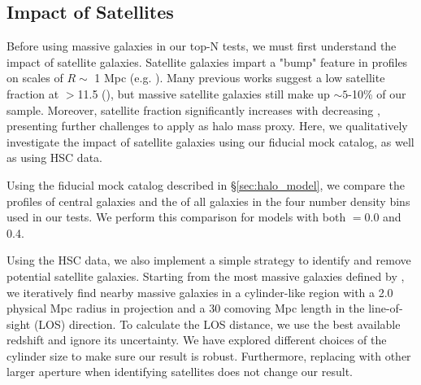 \documentclass[fleqn,usenatbib,useAMS,english]{mnras}
\begin{document}
\subsection{Impact of Satellites}
    \label{sec:satellite}


    Before using massive galaxies in our top-N tests, we must first understand the impact of
    satellite galaxies. Satellite galaxies impart a "bump" feature in \dsigma{} profiles on
    scales of $R\sim$ 1 Mpc (e.g. \citealt{Mandelbaum2006a, Leauthaud2012}).
    Many previous works suggest a low satellite fraction at \logms{}$>$11.5 (\addref{}), but
    massive satellite galaxies still make up $\sim 5$-10\% of our sample.
    Moreover, satellite fraction significantly increases with decreasing \mstar{}, presenting
    further challenges to apply \mstar{} as halo mass proxy.
    Here, we qualitatively investigate the impact of satellite galaxies using our fiducial mock
    catalog, as well as using HSC data.

    Using the fiducial mock catalog described in \S \ref{sec:halo_model}, we compare the
    \dsigma{} profiles of central galaxies and the \dsigma{} of all galaxies in the four number
    density bins used in our \topn{} tests. We perform this comparison for models with both
    \sigmh{}$=0.0$ and 0.4.

    Using the HSC data, we also implement a simple strategy to identify and remove potential
    satellite galaxies.
    Starting from the most massive galaxies defined by \mmax{}, we iteratively find nearby
    massive galaxies in a cylinder-like region with a 2.0 physical Mpc radius in projection and a
    30 comoving Mpc length in the line-of-sight (LOS) direction.
    To calculate the LOS distance, we use the best available redshift and ignore its uncertainty.
    We have explored different choices of the cylinder size to make sure our result is robust.
    Furthermore, replacing \mmax{} with other larger aperture \mstar{} when identifying
    satellites does not change our result.

\end{document}
